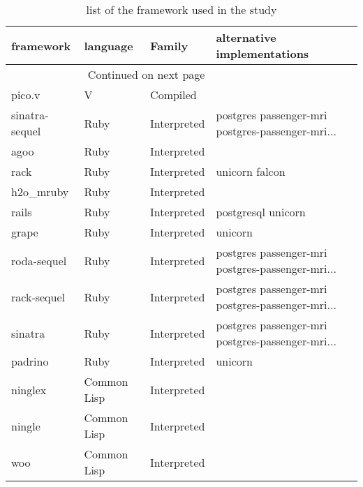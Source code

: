 



\begin{longtable}{llll}
    \caption{list of the framework used in the study}
    \label{table:framework_all}
    \toprule
    framework        & language    & Family      & alternative implementations                        \\
    \midrule
    \endhead
    \midrule
    \multicolumn{3}{r}{{Continued on next page}}                                                      \\
    \midrule
    \endfoot

    \bottomrule
    \endlastfoot
    pico.v           & V           & Compiled    &                                                    \\
    sinatra-sequel   & Ruby        & Interpreted & postgres passenger-mri postgres-passenger-mri...   \\
    agoo             & Ruby        & Interpreted &                                                    \\
    rack             & Ruby        & Interpreted & unicorn falcon                                     \\
    h2o\_mruby       & Ruby        & Interpreted &                                                    \\
    rails            & Ruby        & Interpreted & postgresql unicorn                                 \\
    grape            & Ruby        & Interpreted & unicorn                                            \\
    roda-sequel      & Ruby        & Interpreted & postgres passenger-mri postgres-passenger-mri...   \\
    rack-sequel      & Ruby        & Interpreted & postgres passenger-mri postgres-passenger-mri...   \\
    sinatra          & Ruby        & Interpreted & postgres passenger-mri postgres-passenger-mri...   \\
    padrino          & Ruby        & Interpreted & unicorn                                            \\
    ninglex          & Common Lisp & Interpreted &                                                    \\
    ningle           & Common Lisp & Interpreted &                                                    \\
    woo              & Common Lisp & Interpreted &                                                    \\

\end{longtable}
